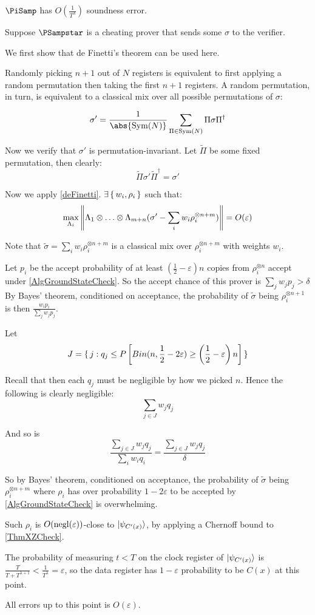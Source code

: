 \begin{thm}
    \label{QPIP1thm}
	$\PiSamp$ has $O(\frac{1}{T^\lambda})$ soundness error.
\end{thm}
\begin{prf}
	Suppose $\PSampstar$ is a cheating prover that sends some $\sigma$ to the verifier.

	We first show that de Finetti's theorem can be used here.

	Randomly picking $n+1$ out of $N$ registers is equivalent to first applying a random permutation then taking the first $n+1$ registers.
	A random permutation, in turn, is equivalent to a classical mix over all possible permutations of $\sigma$:

	$$\sigma'=\frac{1}{\abs{\Sym(N)}}\sum_{\Pi\in\Sym(N)}\Pi\sigma\Pi^\dagger$$

	Now we verify that $\sigma'$ is permutation-invariant.
	Let $\tilde{\Pi}$ be some fixed permutation, then clearly:
	$$\tilde{\Pi}\sigma'\tilde{\Pi}^\dagger=\sigma'$$

	Now we apply \cref{deFinetti}. $\exists\set{w_i, \rho_i}$ such that:
	$$\max_{\Lambda_i}\left\lVert\Lambda_1\otimes\ldots\otimes\Lambda_{m+n}(\sigma'-\sum_i w_i\rho_i^{\otimes n+m})\right\rVert=O(\varepsilon)$$

	Note that $\tilde\sigma=\sum_i w_i\rho_i^{\otimes n+m}$ is a classical mix over $\rho_i^{\otimes n+m}$ with weights $w_i$.

	Let $p_i$ be the accept probability of at least $(\frac{1}{2}-\varepsilon)n$ copies from $\rho_i^{\otimes n}$ accept under \cref{AlgGroundStateCheck}.
	So the accept chance of this prover is $\sum_j w_j p_j>\delta$
	By Bayes' theorem, conditioned on acceptance, the probability of $\tilde{\sigma}$ being $\rho_i^{\otimes n+1}$ is then $\frac{w_i p_i}{\sum_j w_j p_j}$.

	Let
	$$J=\set{j:q_j\leq P\left[Bin(n, \frac{1}{2}-2\varepsilon)\geq\left(\frac{1}{2}-\varepsilon\right)n\right]}$$

	Recall that then each $q_j$ must be negligible by how we picked $n$. Hence the following is clearly negligible:
	$$\sum_{j\in J} w_j q_j$$

	And so is
	$$\frac{\sum_{j\in J} w_j q_j}{\sum_i w_i q_i}=\frac{\sum_{j\in J} w_j q_j}{\delta}$$

	So by Bayes' theorem, conditioned on acceptance, the probability of $\tilde{\sigma}$ being $\rho_i^{\otimes n+m}$ where $\rho_i$ has over probability $1-2\varepsilon$ to be accepted by \cref{AlgGroundStateCheck} is overwhelming.

	Such $\rho_i$ is $O(\operatorname{negl}(\varepsilon))$-close to $\ket{\psi_{C'(x)}}$, by applying a Chernoff bound to \cref{ThmXZCheck}.

	The probability of measuring $t<T$ on the clock register of $\ket{\psi_{C'(x)}}$ is $\frac{T}{T+T^{\lambda+1}}<\frac{1}{T^\lambda}=\varepsilon$,
	so the data register has $1-\varepsilon$ probability to be $C(x)$ at this point.

	All errors up to this point is $O(\varepsilon)$.
\end{prf}

